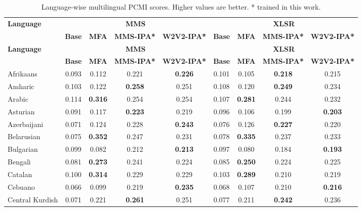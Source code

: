 \begingroup
\scriptsize
\setlength{\tabcolsep}{3pt}
\renewcommand{\arraystretch}{0.92}
\begin{longtable}{lcccccccc}
\caption{Language-wise multilingual PCMI scores. Higher values are better. * trained in this work.}\label{tab:pcmi_table}\\
\toprule
\multirow{2}{*}{\textbf{Language}} & \multicolumn{4}{c}{\textbf{MMS}} & \multicolumn{4}{c}{\textbf{XLSR}} \\
\cmidrule(lr){2-5}\cmidrule(lr){6-9}
& \textbf{Base}& \textbf{MFA}& \textbf{MMS-IPA*}& \textbf{W2V2-IPA*}& \textbf{Base}& \textbf{MFA}& \textbf{MMS-IPA*}& \textbf{W2V2-IPA*}\\
\midrule
\endfirsthead
\toprule
\multirow{2}{*}{\textbf{Language}} & \multicolumn{4}{c}{\textbf{MMS}} & \multicolumn{4}{c}{\textbf{XLSR}} \\
\cmidrule(lr){2-5}\cmidrule(lr){6-9}
& \textbf{Base}& \textbf{MFA}& \textbf{MMS-IPA*}& \textbf{W2V2-IPA*}& \textbf{Base}& \textbf{MFA}& \textbf{MMS-IPA*}& \textbf{W2V2-IPA*}\\
\midrule
\endhead
\bottomrule
\endfoot
Afrikaans & 0.093 & 0.112 & 0.221 & \textbf{0.226} & 0.101 & 0.105 & \textbf{0.218} & 0.215 \\
Amharic & 0.103 & 0.122 & \textbf{0.258} & 0.251 & 0.108 & 0.120 & \textbf{0.249} & 0.234 \\
Arabic & 0.114 & \textbf{0.316} & 0.254 & 0.254 & 0.107 & \textbf{0.281} & 0.244 & 0.232 \\
Asturian & 0.091 & 0.117 & \textbf{0.223} & 0.219 & 0.096 & 0.106 & 0.199 & \textbf{0.203} \\
Azerbaijani & 0.071 & 0.124 & 0.228 & \textbf{0.243} & 0.076 & 0.126 & \textbf{0.227} & 0.220 \\
Belarusian & 0.075 & \textbf{0.352} & 0.247 & 0.231 & 0.078 & \textbf{0.335} & 0.237 & 0.233 \\
Bulgarian & 0.099 & 0.082 & 0.212 & \textbf{0.213} & 0.097 & 0.080 & 0.184 & \textbf{0.193} \\
Bengali & 0.081 & \textbf{0.273} & 0.241 & 0.224 & 0.085 & \textbf{0.250} & 0.224 & 0.225 \\
Catalan & 0.100 & \textbf{0.314} & 0.229 & 0.229 & 0.103 & \textbf{0.289} & 0.210 & 0.219 \\
Cebuano & 0.066 & 0.099 & 0.219 & \textbf{0.235} & 0.068 & 0.107 & 0.210 & \textbf{0.216} \\
Central Kurdish & 0.071 & 0.221 & \textbf{0.261} & 0.251 & 0.077 & 0.211 & \textbf{0.242} & 0.236 \\

\end{longtable}

